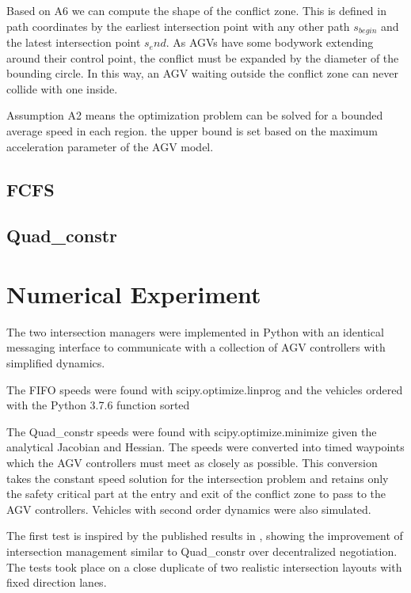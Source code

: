 \documentclass[11pt]{article} %
\begin{document}
Based on A6 we can compute the shape of the conflict zone. This is defined in path coordinates by the earliest intersection point with any other path $s_{begin}$ and the latest intersection point $s_end$. As AGVs have some bodywork extending around their control point, the conflict must be expanded by the diameter of the bounding circle. In this way, an AGV waiting outside the conflict zone can never collide with one inside. 

Assumption A2 means the optimization problem can  be solved for a bounded average speed in each region. the upper bound is set based on the maximum acceleration parameter of the AGV model. 
\subsection{FCFS}
\subsection{Quad\_constr}
    

\section{Numerical Experiment}
The two intersection managers were implemented in Python with an identical messaging interface to communicate with a collection of AGV controllers with simplified dynamics. 

The FIFO speeds were found with scipy.optimize.linprog and the vehicles ordered with the Python 3.7.6 function sorted

The Quad\_constr speeds were found with scipy.optimize.minimize given the analytical Jacobian and Hessian.
The speeds were converted into timed waypoints which the AGV controllers must meet as closely as possible. This conversion takes the constant speed solution for the intersection problem and retains only the safety critical part at the entry and exit of the conflict zone to pass to the AGV controllers. Vehicles with second order dynamics were also simulated.

The first test is inspired by the published results in \cite{Digani2019}, showing the improvement of intersection management similar to Quad\_constr over decentralized negotiation. The tests took place on a close duplicate of two realistic intersection layouts with fixed direction lanes.
\end{document}
